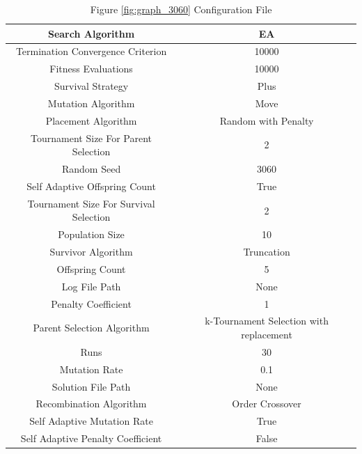 \documentclass{standalone}
\begin{document}
\begin{table}[!htb]
	\centering
	\caption{Figure \ref{fig:graph_3060} Configuration File}
	\label{tab:graph_3060}
	\begin{tabular}{| c | c |}
		\hline
		Search Algorithm		& EA		 \\
		\hline
		Termination Convergence Criterion		& 10000		 \\
		\hline
		Fitness Evaluations		& 10000		 \\
		\hline
		Survival Strategy		& Plus		 \\
		\hline
		Mutation Algorithm		& Move		 \\
		\hline
		Placement Algorithm		& Random with Penalty		 \\
		\hline
		Tournament Size For Parent Selection		& 2		 \\
		\hline
		Random Seed		& 3060		 \\
		\hline
		Self Adaptive Offspring Count		& True		 \\
		\hline
		Tournament Size For Survival Selection		& 2		 \\
		\hline
		Population Size		& 10		 \\
		\hline
		Survivor Algorithm		& Truncation		 \\
		\hline
		Offspring Count		& 5		 \\
		\hline
		Log File Path		& None		 \\
		\hline
		Penalty Coefficient		& 1		 \\
		\hline
		Parent Selection Algorithm		& k-Tournament Selection with replacement		 \\
		\hline
		Runs		& 30		 \\
		\hline
		Mutation Rate		& 0.1		 \\
		\hline
		Solution File Path		& None		 \\
		\hline
		Recombination Algorithm		& Order Crossover		 \\
		\hline
		Self Adaptive Mutation Rate		& True		 \\
		\hline
		Self Adaptive Penalty Coefficient		& False		 \\
		\hline
	\end{tabular}
\end{table}
\end{document}
